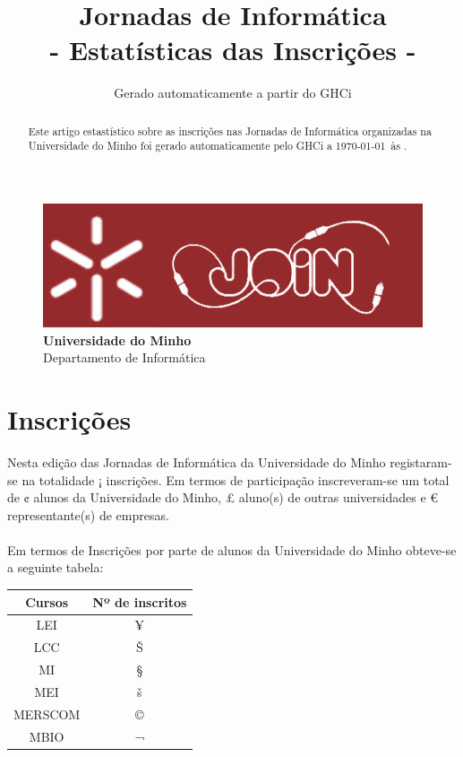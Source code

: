 \documentclass[a4paper]{article}
\title{\Huge{Jornadas de Informática\\- Estatísticas das Inscrições -}}
\author{Gerado automaticamente a partir do GHCi}
\date{}
\begin{document}
\begin{figure}
\includegraphics[scale=1]{logo}\\
\footnotesize{\textbf{Universidade do Minho}\\
Departamento de Informática}
\end{figure}
\maketitle

\begin{abstract}
Este artigo estastístico sobre as inscrições nas Jornadas de Informática organizadas na Universidade do Minho foi gerado automaticamente pelo GHCi a \today \ às \currenttime. \end{abstract}
\section{Inscrições}
Nesta edição das Jornadas de Informática da Universidade do Minho registaram-se na totalidade ¡ inscrições. Em termos de participação inscreveram-se um total de ¢ alunos da Universidade do Minho, £ aluno(s) de outras universidades e € representante(s) de empresas.\\ \\
Em termos de Inscrições por parte de alunos da Universidade do Minho obteve-se a seguinte tabela: \\
\begin{center}
    \begin{tabular}{ | c | c |}
    \hline
    Cursos & Nº de inscritos \\    \hline
    LEI & ¥ \\      \hline
    LCC & Š \\     \hline
    MI & § \\    \hline
    MEI & š \\    \hline
    MERSCOM & © \\    \hline
    MBIO & ¬ \\
    \hline
    \end{tabular}
\end{center}
\end{document}
